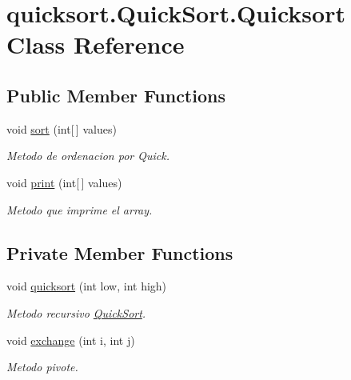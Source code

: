 \hypertarget{classquicksort_1_1_quick_sort_1_1_quicksort}{}\section{quicksort.\+Quick\+Sort.\+Quicksort Class Reference}
\label{classquicksort_1_1_quick_sort_1_1_quicksort}
\subsection*{Public Member Functions}
\begin{DoxyCompactItemize}
\item 
void \hyperlink{classquicksort_1_1_quick_sort_1_1_quicksort_adf33161c7c6f5bab86ad6c4f512f850c}{sort} (int\mbox{[}$\,$\mbox{]} values)
\begin{DoxyCompactList}\small\item\em Metodo de ordenacion por Quick. \end{DoxyCompactList}\item 
void \hyperlink{classquicksort_1_1_quick_sort_1_1_quicksort_a6790f4b784050741faeed056b58de4ba}{print} (int\mbox{[}$\,$\mbox{]} values)
\begin{DoxyCompactList}\small\item\em Metodo que imprime el array. \end{DoxyCompactList}\end{DoxyCompactItemize}
\subsection*{Private Member Functions}
\begin{DoxyCompactItemize}
\item 
void \hyperlink{classquicksort_1_1_quick_sort_1_1_quicksort_acebd97e5f32c5170226150de796e9c85}{quicksort} (int low, int high)
\begin{DoxyCompactList}\small\item\em Metodo recursivo \hyperlink{namespacequicksort_1_1_quick_sort}{Quick\+Sort}. \end{DoxyCompactList}\item 
void \hyperlink{classquicksort_1_1_quick_sort_1_1_quicksort_a83169b60ccb0c644794cb7b16d21edd6}{exchange} (int i, int j)
\begin{DoxyCompactList}\small\item\em Metodo pivote. \end{DoxyCompactList}\end{DoxyCompactItemize}
